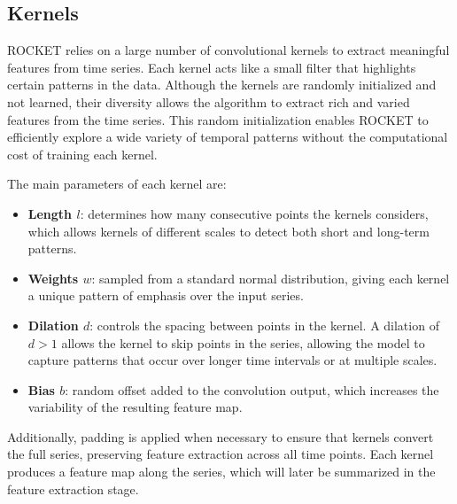 \documentclass[conference]{IEEEtran}
\begin{document}
\subsection{Kernels}
ROCKET relies on a large number of convolutional kernels to extract meaningful features from time series. Each kernel acts like a small filter that highlights certain patterns in the data. Although the kernels are randomly initialized and not learned, their diversity allows the algorithm to extract rich and varied features from the time series. This random initialization enables ROCKET to efficiently explore a wide variety of temporal patterns without the computational cost of training each kernel.

The main parameters of each kernel are:
\begin{itemize}
    \item \textbf{Length $l$}: determines how many consecutive points the kernels considers, which allows kernels of different scales to detect both short and long-term patterns.
    \item \textbf{Weights $w$}: sampled from a standard normal distribution, giving each kernel a unique pattern of emphasis over the input series.
    \item \textbf{Dilation $d$}: controls the spacing between points in the kernel. A dilation of $d > 1$ allows the kernel to skip points in the series, allowing the model to capture patterns that occur over longer time intervals or at multiple scales. 
    \item \textbf{Bias $b$}: random offset added to the convolution output, which increases the variability of the resulting feature map.
\end{itemize}
Additionally, padding is applied when necessary to ensure that kernels convert the full series, preserving feature extraction across all time points. Each kernel produces a feature map along the series, which will later be summarized in the feature extraction stage.
\end{document}
